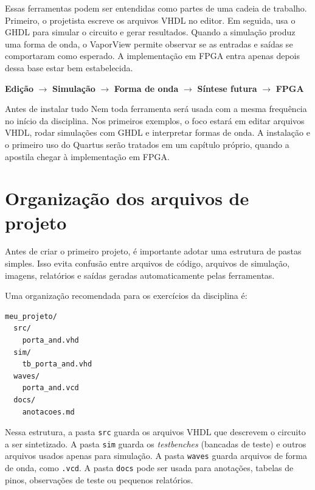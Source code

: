 Essas ferramentas podem ser entendidas como partes de uma cadeia de trabalho. Primeiro, o projetista escreve os arquivos VHDL no editor. Em seguida, usa o GHDL para simular o circuito e gerar resultados. Quando a simulação produz uma forma de onda, o VaporView permite observar se as entradas e saídas se comportaram como esperado. A implementação em FPGA entra apenas depois dessa base estar bem estabelecida.

\begin{center}
\textbf{Edição} $\rightarrow$ \textbf{Simulação} $\rightarrow$ \textbf{Forma de onda} $\rightarrow$ \textbf{Síntese futura} $\rightarrow$ \textbf{FPGA}
\end{center}

\begin{observacao}{Antes de instalar tudo}
Nem toda ferramenta será usada com a mesma frequência no início da disciplina. Nos primeiros exemplos, o foco estará em editar arquivos VHDL, rodar simulações com GHDL e interpretar formas de onda. A instalação e o primeiro uso do Quartus serão tratados em um capítulo próprio, quando a apostila chegar à implementação em FPGA.
\end{observacao}

\section{Organização dos arquivos de projeto}

Antes de criar o primeiro projeto, é importante adotar uma estrutura de pastas simples. Isso evita confusão entre arquivos de código, arquivos de simulação, imagens, relatórios e saídas geradas automaticamente pelas ferramentas.

Uma organização recomendada para os exercícios da disciplina é:

\begin{lstlisting}[language={},caption={Estrutura sugerida para um projeto VHDL simples.},label={cod:estrutura-projeto}]
meu_projeto/
  src/
    porta_and.vhd
  sim/
    tb_porta_and.vhd
  waves/
    porta_and.vcd
  docs/
    anotacoes.md
\end{lstlisting}

Nessa estrutura, a pasta \texttt{src} guarda os arquivos VHDL que descrevem o circuito a ser sintetizado. A pasta \texttt{sim} guarda os \textit{testbenches} (bancadas de teste) e outros arquivos usados apenas para simulação. A pasta \texttt{waves} guarda arquivos de forma de onda, como \texttt{.vcd}. A pasta \texttt{docs} pode ser usada para anotações, tabelas de pinos, observações de teste ou pequenos relatórios.

